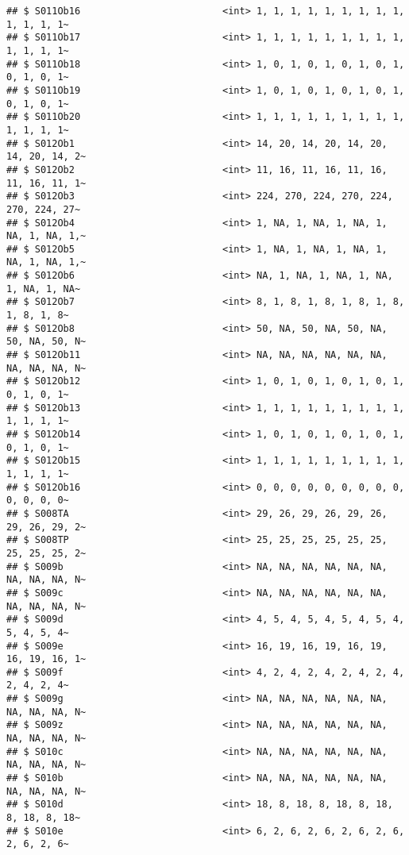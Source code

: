 \documentclass[
]{article}
\begin{document}
\begin{verbatim}
## $ S011Ob16                         <int> 1, 1, 1, 1, 1, 1, 1, 1, 1, 1, 1, 1, 1~
## $ S011Ob17                         <int> 1, 1, 1, 1, 1, 1, 1, 1, 1, 1, 1, 1, 1~
## $ S011Ob18                         <int> 1, 0, 1, 0, 1, 0, 1, 0, 1, 0, 1, 0, 1~
## $ S011Ob19                         <int> 1, 0, 1, 0, 1, 0, 1, 0, 1, 0, 1, 0, 1~
## $ S011Ob20                         <int> 1, 1, 1, 1, 1, 1, 1, 1, 1, 1, 1, 1, 1~
## $ S012Ob1                          <int> 14, 20, 14, 20, 14, 20, 14, 20, 14, 2~
## $ S012Ob2                          <int> 11, 16, 11, 16, 11, 16, 11, 16, 11, 1~
## $ S012Ob3                          <int> 224, 270, 224, 270, 224, 270, 224, 27~
## $ S012Ob4                          <int> 1, NA, 1, NA, 1, NA, 1, NA, 1, NA, 1,~
## $ S012Ob5                          <int> 1, NA, 1, NA, 1, NA, 1, NA, 1, NA, 1,~
## $ S012Ob6                          <int> NA, 1, NA, 1, NA, 1, NA, 1, NA, 1, NA~
## $ S012Ob7                          <int> 8, 1, 8, 1, 8, 1, 8, 1, 8, 1, 8, 1, 8~
## $ S012Ob8                          <int> 50, NA, 50, NA, 50, NA, 50, NA, 50, N~
## $ S012Ob11                         <int> NA, NA, NA, NA, NA, NA, NA, NA, NA, N~
## $ S012Ob12                         <int> 1, 0, 1, 0, 1, 0, 1, 0, 1, 0, 1, 0, 1~
## $ S012Ob13                         <int> 1, 1, 1, 1, 1, 1, 1, 1, 1, 1, 1, 1, 1~
## $ S012Ob14                         <int> 1, 0, 1, 0, 1, 0, 1, 0, 1, 0, 1, 0, 1~
## $ S012Ob15                         <int> 1, 1, 1, 1, 1, 1, 1, 1, 1, 1, 1, 1, 1~
## $ S012Ob16                         <int> 0, 0, 0, 0, 0, 0, 0, 0, 0, 0, 0, 0, 0~
## $ S008TA                           <int> 29, 26, 29, 26, 29, 26, 29, 26, 29, 2~
## $ S008TP                           <int> 25, 25, 25, 25, 25, 25, 25, 25, 25, 2~
## $ S009b                            <int> NA, NA, NA, NA, NA, NA, NA, NA, NA, N~
## $ S009c                            <int> NA, NA, NA, NA, NA, NA, NA, NA, NA, N~
## $ S009d                            <int> 4, 5, 4, 5, 4, 5, 4, 5, 4, 5, 4, 5, 4~
## $ S009e                            <int> 16, 19, 16, 19, 16, 19, 16, 19, 16, 1~
## $ S009f                            <int> 4, 2, 4, 2, 4, 2, 4, 2, 4, 2, 4, 2, 4~
## $ S009g                            <int> NA, NA, NA, NA, NA, NA, NA, NA, NA, N~
## $ S009z                            <int> NA, NA, NA, NA, NA, NA, NA, NA, NA, N~
## $ S010c                            <int> NA, NA, NA, NA, NA, NA, NA, NA, NA, N~
## $ S010b                            <int> NA, NA, NA, NA, NA, NA, NA, NA, NA, N~
## $ S010d                            <int> 18, 8, 18, 8, 18, 8, 18, 8, 18, 8, 18~
## $ S010e                            <int> 6, 2, 6, 2, 6, 2, 6, 2, 6, 2, 6, 2, 6~

\end{verbatim}
\end{document}
